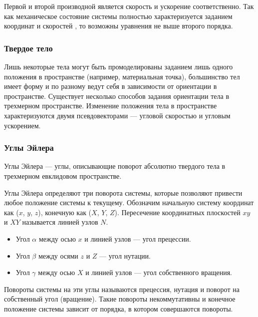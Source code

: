 Первой и второй производной является скорость и ускорение соответственно.
Так как механическое состояние системы полностью характеризуется заданием координат
и скоростей %
, то возможны уравнения не выше второго порядка. 

\subsubsection{Твердое тело}
Лишь некоторые тела могут быть промоделированы заданием лишь одного положения в пространстве 
(например, материальная точка), большинство тел имеет форму и по разному ведут себя в зависимости
от ориентации в пространстве. Существует несколько способов задания ориентации тела в трехмерном
пространстве. Изменение положения тела в пространстве характеризуются двумя псевдовекторами ---
угловой скоростью и угловым ускорением.
\subsubsection{Углы Эйлера}
Углы Эйлера --- углы, описывающие поворот абсолютно твердого тела в трехмерном евклидовом пространстве.

Углы Эйлера определяют три поворота системы, которые позволяют привести любое положение системы к текущему.
Обозначим начальную систему координат как ($x$, $y$, $z$), конечную как ($X$, $Y$, $Z$).
Пересечение координатных плоскостей $xy$ и $XY$ называется линией узлов $N$.
\begin{itemize}
  \item Угол $\alpha$ между осью $x$ и линией узлов --- угол прецессии.
  \item Угол $\beta$ между осями $z$ и $Z$ --- угол нутации.
  \item Угол $\gamma$ между осью $X$ и линией узлов --- угол собственного вращения.
\end{itemize}
  
Повороты системы на эти углы называются прецессия, нутация и поворот на собственный угол (вращение).
Такие повороты некоммутативны и конечное положение системы зависит от порядка, в котором совершаются повороты. 

